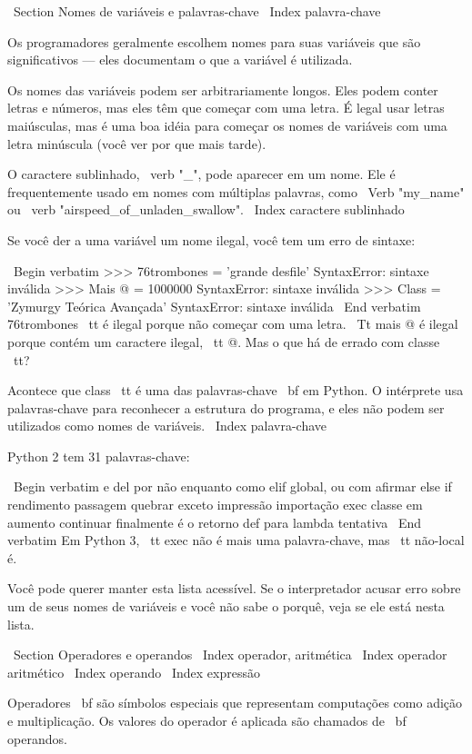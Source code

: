\documentclass[10pt]{book}
\begin{document}
{\ Section {Nomes de variáveis ​​e palavras-chave}
\ Index {palavra-chave}

Os programadores geralmente escolhem nomes para suas variáveis ​​que
são significativos --- eles documentam o que a variável é utilizada.

Os nomes das variáveis ​​podem ser arbitrariamente longos. Eles podem conter
letras e números, mas eles têm que começar com uma letra.
É legal usar letras maiúsculas, mas é uma boa idéia
para começar os nomes de variáveis ​​com uma letra minúscula (você
ver por que mais tarde).

O caractere sublinhado, \ verb "_", pode aparecer em um nome.
Ele é frequentemente usado em nomes com múltiplas palavras, como
\ Verb "my_name" ou \ verb "airspeed_of_unladen_swallow".
\ Index {caractere sublinhado}

Se você der a uma variável um nome ilegal, você tem um erro de sintaxe:

\ Begin {verbatim}
>>> 76trombones = 'grande desfile'
SyntaxError: sintaxe inválida
>>> Mais @ = 1000000
SyntaxError: sintaxe inválida
>>> Class = 'Zymurgy Teórica Avançada'
SyntaxError: sintaxe inválida
\ End {verbatim}
%
{76trombones \ tt} é ilegal porque não começar com uma letra.
{\ Tt mais @} é ilegal porque contém um caractere ilegal, {\ tt
@}. Mas o que há de errado com classe {\ tt}?

Acontece que {class \ tt} é uma das palavras-chave {\ bf} em Python. O
intérprete usa palavras-chave para reconhecer a estrutura do programa,
e eles não podem ser utilizados como nomes de variáveis.
\ Index {palavra-chave}

Python 2 tem 31 palavras-chave:

\ Begin {verbatim}
e del por não enquanto    
como elif global, ou com     
afirmar else if rendimento passagem    
quebrar exceto impressão importação              
exec classe em aumento              
continuar finalmente é o retorno             
def para lambda tentativa
\ End {verbatim}
%
Em Python 3, {\ tt exec} não é mais uma palavra-chave, mas {\ tt} não-local é.

Você pode querer manter esta lista acessível. Se o interpretador acusar erro
sobre um de seus nomes de variáveis ​​e você não sabe o porquê, veja se ele
está nesta lista.


\ Section {Operadores e operandos}
\ Index {operador, aritmética}
\ Index {operador aritmético}
\ Index {operando}
\ Index {expressão}

{Operadores \ bf} são símbolos especiais que representam computações como
adição e multiplicação. Os valores do operador é aplicada
são chamados de {\ bf operandos}.

}
\end{document}
